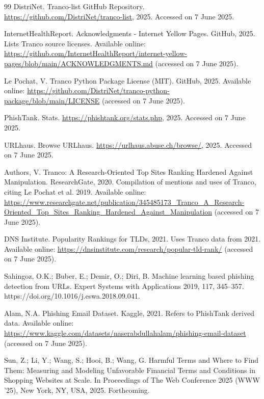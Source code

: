 \documentclass[journal,article,submit,pdftex,moreauthors]{Definitions/mdpi}
\begin{document}
\begin{thebibliography}{99}
DistriNet. Tranco-list GitHub Repository. \url{https://github.com/DistriNet/tranco-list}, 2025. Accessed on 7 June 2025.

InternetHealthReport. Acknowledgments - Internet Yellow Pages. GitHub, 2025. Lists Tranco source licenses. Available online: \url{https://github.com/InternetHealthReport/internet-yellow-pages/blob/main/ACKNOWLEDGMENTS.md} (accessed on 7 June 2025).

Le Pochat, V. Tranco Python Package License (MIT). GitHub, 2025. Available online: \url{https://github.com/DistriNet/tranco-python-package/blob/main/LICENSE} (accessed on 7 June 2025).

PhishTank. Stats. \url{https://phishtank.org/stats.php}, 2025. Accessed on 7 June 2025.

URLhaus. Browse URLhaus. \url{https://urlhaus.abuse.ch/browse/}, 2025. Accessed on 7 June 2025.

Authors, V. Tranco: A Research-Oriented Top Sites Ranking Hardened Against Manipulation. ResearchGate, 2020. Compilation of mentions and uses of Tranco, citing Le Pochat et al. 2019. Available online: \url{https://www.researchgate.net/publication/345485173_Tranco_A_Research-Oriented_Top_Sites_Ranking_Hardened_Against_Manipulation} (accessed on 7 June 2025).

DNS Institute. Popularity Rankings for TLDs, 2021. Uses Tranco data from 2021. Available online: \url{https://dnsinstitute.com/research/popular-tld-rank/} (accessed on 7 June 2025).

Sahingoz, O.K.; Buber, E.; Demir, O.; Diri, B. Machine learning based phishing detection from URLs. Expert Systems with Applications 2019, 117, 345–357. https://doi.org/10.1016/j.eswa.2018.09.041.

Alam, N.A. Phishing Email Dataset. Kaggle, 2021. Refers to PhishTank derived data. Available online: \url{https://www.kaggle.com/datasets/naserabdullahalam/phishing-email-dataset} (accessed on 7 June 2025).

Sun, Z.; Li, Y.; Wang, S.; Hooi, B.; Wang, G. Harmful Terms and Where to Find Them: Measuring and Modeling Unfavorable Financial Terms and Conditions in Shopping Websites at Scale. In Proceedings of The Web Conference 2025 (WWW '25), New York, NY, USA, 2025. Forthcoming.


\end{thebibliography}
\end{document}

